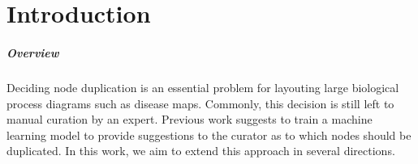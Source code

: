 \documentclass[
	fontsize=10pt, %
	twoside=false, %
	secnumdepth=1, %
  toc=indentunnumbered %
]{kaobook}
\begin{document}




\chapter{Introduction}








\paragraph{Overview} Deciding node duplication is an essential problem for
layouting large biological process diagrams such as disease maps. 
Commonly, this decision is still left to manual curation by an expert. Previous
work
\cite{nielsen_MachineLearningSupport_2019}
suggests to train a machine learning model to provide suggestions to the curator
as to which nodes should be duplicated. In this work, we aim to extend this
approach in several directions.
\end{document}
